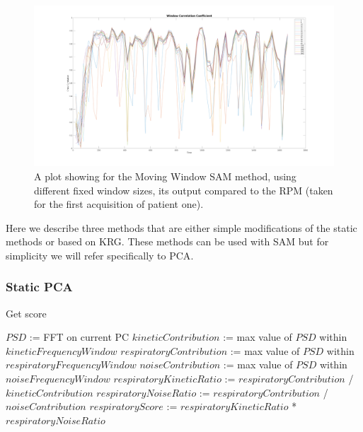         \begin{figure}
            \centering
        
            \includegraphics[width=1.0\linewidth]{figures/sam_window_correlation_coefficient.png}
        
            \captionsetup{singlelinecheck=false, justification=centering}
            \caption{A plot showing for the Moving Window \gls{SAM} method, using different fixed window sizes, its output compared to the \gls{RPM} (taken for the first acquisition of patient one).}
            \label{fig:sam_window_correlation_coefficient}
        \end{figure}
        
        Here we describe three methods that are either simple modifications of the static methods or based on \gls{KRG}. These methods can be used with \gls{SAM} but for simplicity we will refer specifically to \gls{PCA}.
        
        \subsubsection{Static \gls{PCA}} \label{sec:static_pca}
            \begin{algorithm}
                \caption{Get score}
                \;
                $PSD$ := \gls{FFT} on current \gls{PC}\;
                \;
                $kineticContribution$ := max value of $PSD$ within $kineticFrequencyWindow$\;
                $respiratoryContribution$ := max value of $PSD$  within $respiratoryFrequencyWindow$\;
                $noiseContribution$ := max value of $PSD$ within $noiseFrequencyWindow$\;
                \;
                $respiratoryKineticRatio$ := $respiratoryContribution$ / $kineticContribution$\;
                $respiratoryNoiseRatio$ := $respiratoryContribution$ / $noiseContribution$\;
                \;
                $respiratoryScore$ := $respiratoryKineticRatio$ * $respiratoryNoiseRatio$\;
            \end{algorithm} \label{eq:get_score_pseudo_code}
            
